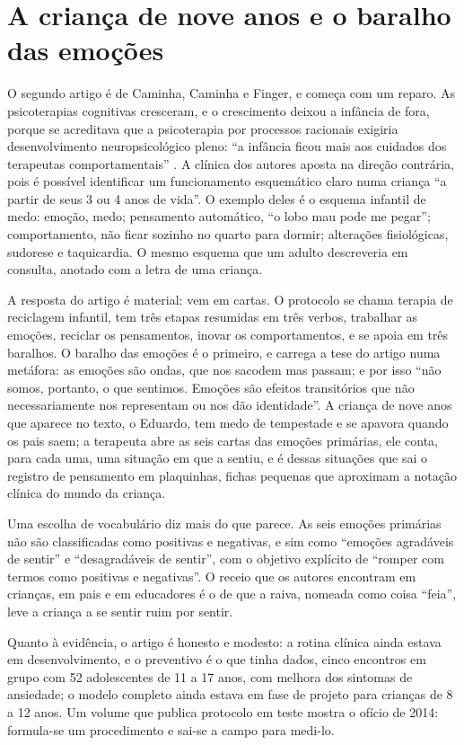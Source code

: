 \documentclass[12pt]{article}
\begin{document}
\section{A criança de nove anos e o baralho das emoções}

O segundo artigo é de Caminha, Caminha e Finger, e começa com um reparo. As psicoterapias cognitivas cresceram, e o crescimento deixou a infância de fora, porque se acreditava que a psicoterapia por processos racionais exigiria desenvolvimento neuropsicológico pleno: ``a infância ficou mais aos cuidados dos terapeutas comportamentais'' \cite{caminha}. A clínica dos autores aposta na direção contrária, pois é possível identificar um funcionamento esquemático claro numa criança ``a partir de seus 3 ou 4 anos de vida''. O exemplo deles é o esquema infantil de medo: emoção, medo; pensamento automático, ``o lobo mau pode me pegar''; comportamento, não ficar sozinho no quarto para dormir; alterações fisiológicas, sudorese e taquicardia. O mesmo esquema que um adulto descreveria em consulta, anotado com a letra de uma criança.

A resposta do artigo é material: vem em cartas. O protocolo se chama terapia de reciclagem infantil, tem três etapas resumidas em três verbos, trabalhar as emoções, reciclar os pensamentos, inovar os comportamentos, e se apoia em três baralhos. O baralho das emoções é o primeiro, e carrega a tese do artigo numa metáfora: as emoções são ondas, que nos sacodem mas passam; e por isso ``não somos, portanto, o que sentimos. Emoções são efeitos transitórios que não necessariamente nos representam ou nos dão identidade''. A criança de nove anos que aparece no texto, o Eduardo, tem medo de tempestade e se apavora quando os pais saem; a terapeuta abre as seis cartas das emoções primárias, ele conta, para cada uma, uma situação em que a sentiu, e é dessas situações que sai o registro de pensamento em plaquinhas, fichas pequenas que aproximam a notação clínica do mundo da criança.

Uma escolha de vocabulário diz mais do que parece. As seis emoções primárias não são classificadas como positivas e negativas, e sim como ``emoções agradáveis de sentir'' e ``desagradáveis de sentir'', com o objetivo explícito de ``romper com termos como positivas e negativas''. O receio que os autores encontram em crianças, em pais e em educadores é o de que a raiva, nomeada como coisa ``feia'', leve a criança a se sentir ruim por sentir.

Quanto à evidência, o artigo é honesto e modesto: a rotina clínica ainda estava em desenvolvimento, e o preventivo é o que tinha dados, cinco encontros em grupo com 52 adolescentes de 11 a 17 anos, com melhora dos sintomas de ansiedade; o modelo completo ainda estava em fase de projeto para crianças de 8 a 12 anos. Um volume que publica protocolo em teste mostra o ofício de 2014: formula-se um procedimento e sai-se a campo para medi-lo.
\end{document}
